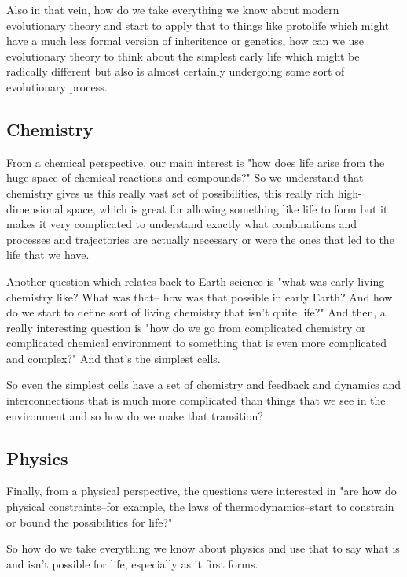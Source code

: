 \documentclass[]{article}
\begin{document}
Also in that vein, how do we take
everything we know about modern
evolutionary theory and start to apply that to things like protolife which
might have a much less formal version of
inheritence or genetics,
how can we use evolutionary theory to
think about the simplest early life which
might be radically different but also is 
almost certainly undergoing some sort of
evolutionary process.

\subsection{Chemistry}
From a chemical perspective, our main
interest is "how does life arise from the
huge space of chemical reactions and 
compounds?"
So we understand that chemistry gives us
this really vast set of possibilities,
this really rich high-dimensional space,
which is great for allowing something
like life to form but it makes it very
complicated to understand exactly what
combinations and processes and
trajectories are actually necessary or
were the ones that led to the life that we
have.
	
Another question which relates back to 
Earth science is "what was early living
chemistry like? What was that-- how was
that possible in early Earth? And how do
we start to define sort of living
chemistry that isn't quite life?"
And then, a really interesting question is
"how do we go from complicated chemistry
or complicated chemical environment to
something that is even more complicated
and complex?" And that's the simplest
cells.
	
So even the simplest cells have a set of
chemistry and feedback and dynamics and
interconnections that is much more 
complicated than things that we see in the
environment and so how do we make that
transition?

\subsection{Physics}	
Finally, from a physical perspective, the
questions were interested in "are how do
physical constraints--for example, the
laws of thermodynamics--start to constrain
or bound the possibilities for life?"
	
So how do we take everything we know about
physics and use that to say what is and
isn't possible for life, especially as it 
first forms.
	
\end{document}
